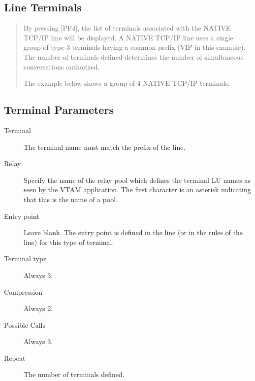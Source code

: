 \documentclass[letterpaper,10pt,english]{sphinxmanual}
\begin{document}
\subsection{Line Terminals}
\label{\detokenize{connectivity_guide:line-terminals}}\label{\detokenize{connectivity_guide:index-36}}\begin{quote}

By pressing {[}PF4{]}, the list of terminals associated with the NATIVE TCP/IP line will be displayed. A NATIVE TCP/IP line uses a single group of type-3 terminals having a common prefix (VIP in this example). The number of terminals defined determines the number of simultaneous conversations authorized.

The example below shows a group of 4 NATIVE TCP/IP terminals:
\end{quote}


\ignorespaces 

\subsection{Terminal Parameters}
\label{\detokenize{connectivity_guide:index-37}}\label{\detokenize{connectivity_guide:id13}}\begin{description}
\item[{Terminal}] \leavevmode
The terminal name must match the prefix of the line.

\item[{Relay}] \leavevmode
Specify the name of the relay pool which defines the terminal LU
names as seen by the VTAM application. The first character is an
asterisk indicating that this is the name of a pool.

\item[{Entry point}] \leavevmode
Leave blank. The entry point is defined in the line (or in the rules
of the line) for this type of terminal.

\item[{Terminal type}] \leavevmode
Always 3.

\item[{Compression}] \leavevmode
Always 2.

\item[{Possible Calls}] \leavevmode
Always 3.

\item[{Repeat}] \leavevmode
The number of terminals defined.

\end{description}
\end{document}
